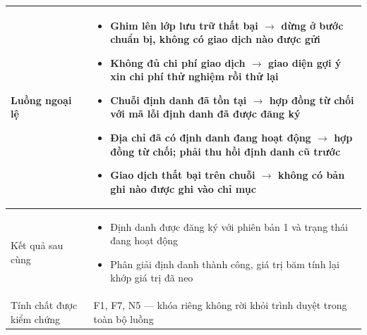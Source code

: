 \begin{longtable}{|p{3.4cm}|p{10.3cm}|}
Luồng ngoại lệ &
\begin{itemize}[leftmargin=*, nosep]
    \item Ghim lên lớp lưu trữ thất bại $\rightarrow$ dừng ở bước chuẩn bị, không có giao dịch nào được gửi
    \item Không đủ chi phí giao dịch $\rightarrow$ giao diện gợi ý xin chi phí thử nghiệm rồi thử lại
    \item Chuỗi định danh đã tồn tại $\rightarrow$ hợp đồng từ chối với mã lỗi định danh đã được đăng ký
    \item Địa chỉ đã có định danh đang hoạt động $\rightarrow$ hợp đồng từ chối; phải thu hồi định danh cũ trước
    \item Giao dịch thất bại trên chuỗi $\rightarrow$ không có bản ghi nào được ghi vào chỉ mục
\end{itemize} \\
\hline

Kết quả sau cùng &
\begin{itemize}[leftmargin=*, nosep]
    \item Định danh được đăng ký với phiên bản 1 và trạng thái đang hoạt động
    \item Phân giải định danh thành công, giá trị băm tính lại khớp giá trị đã neo
\end{itemize} \\
\hline

Tính chất được kiểm chứng &
F1, F7, N5 --- khóa riêng không rời khỏi trình duyệt trong toàn bộ luồng \\
\hline

\end{longtable}
